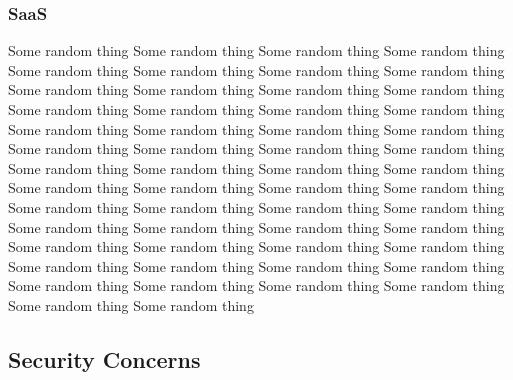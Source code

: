 \subsubsection{SaaS}
Some random thing Some random thing Some random thing Some random thing Some random thing Some random thing Some random thing Some random thing Some random thing Some random thing Some random thing Some random thing Some random thing Some random thing Some random thing Some random thing Some random thing Some random thing Some random thing Some random thing Some random thing Some random thing Some random thing Some random thing Some random thing Some random thing Some random thing Some random thing Some random thing Some random thing Some random thing Some random thing Some random thing Some random thing Some random thing Some random thing Some random thing Some random thing Some random thing Some random thing Some random thing Some random thing Some random thing Some random thing Some random thing Some random thing Some random thing Some random thing Some random thing Some random thing Some random thing Some random thing Some random thing Some random thing 

\subsection{Security Concerns} 

